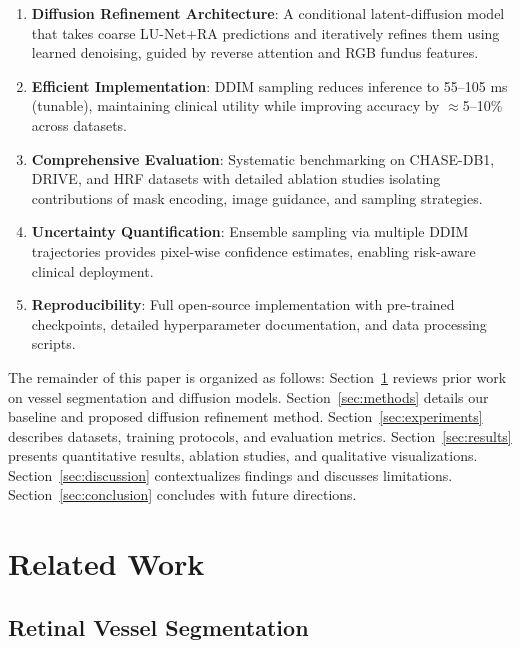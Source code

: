 \documentclass[11pt]{article}
\begin{document}
\begin{enumerate}
    \item \textbf{Diffusion Refinement Architecture}: A conditional latent-diffusion model that takes coarse LU-Net+RA predictions and iteratively refines them using learned denoising, guided by reverse attention and RGB fundus features.
    
    \item \textbf{Efficient Implementation}: DDIM sampling reduces inference to 55--105 ms (tunable), maintaining clinical utility while improving accuracy by $\approx$5--10\% across datasets.
    
    \item \textbf{Comprehensive Evaluation}: Systematic benchmarking on CHASE-DB1, DRIVE, and HRF datasets with detailed ablation studies isolating contributions of mask encoding, image guidance, and sampling strategies.
    
    \item \textbf{Uncertainty Quantification}: Ensemble sampling via multiple DDIM trajectories provides pixel-wise confidence estimates, enabling risk-aware clinical deployment.
    
    \item \textbf{Reproducibility}: Full open-source implementation with pre-trained checkpoints, detailed hyperparameter documentation, and data processing scripts.
\end{enumerate}

The remainder of this paper is organized as follows: Section~\ref{sec:related} reviews prior work on vessel segmentation and diffusion models. Section~\ref{sec:methods} details our baseline and proposed diffusion refinement method. Section~\ref{sec:experiments} describes datasets, training protocols, and evaluation metrics. Section~\ref{sec:results} presents quantitative results, ablation studies, and qualitative visualizations. Section~\ref{sec:discussion} contextualizes findings and discusses limitations. Section~\ref{sec:conclusion} concludes with future directions.

\section{Related Work}
\label{sec:related}

\subsection{Retinal Vessel Segmentation}
\end{document}
